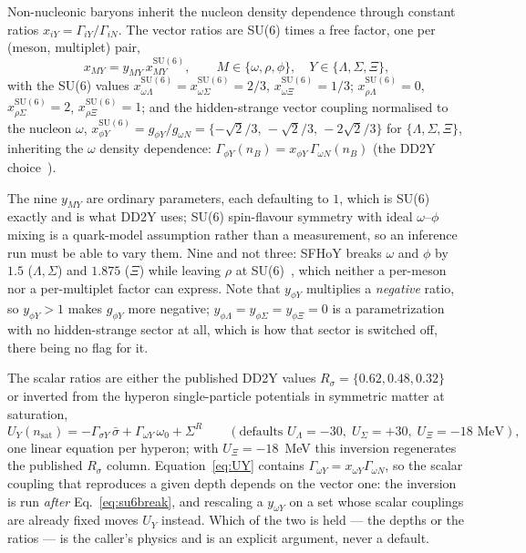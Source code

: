 \documentclass[aps,prc,onecolumn,superscriptaddress,nofootinbib,10pt]{revtex4-2}
\newcommand{\nB}{n_B}
\newcommand{\nsat}{n_{\mathrm{sat}}}
\newcommand{\SigR}{\Sigma^{R}}
\begin{document}
Non-nucleonic baryons inherit the nucleon density dependence through constant
ratios $x_{iY} = \Gamma_{iY}/\Gamma_{iN}$. The vector ratios are SU(6) times a
free factor, one per (meson, multiplet) pair,
%
\begin{equation}
x_{M Y} = y_{M Y}\, x_{M Y}^{\mathrm{SU(6)}},
\qquad M \in \{\omega, \rho, \phi\},\quad
Y \in \{\Lambda, \Sigma, \Xi\},
\label{eq:su6break}
\end{equation}
%
with the SU(6) values
$x^{\mathrm{SU(6)}}_{\omega\Lambda} = x^{\mathrm{SU(6)}}_{\omega\Sigma} = 2/3$,
$x^{\mathrm{SU(6)}}_{\omega\Xi} = 1/3$;
$x^{\mathrm{SU(6)}}_{\rho\Lambda} = 0$,
$x^{\mathrm{SU(6)}}_{\rho\Sigma} = 2$,
$x^{\mathrm{SU(6)}}_{\rho\Xi} = 1$; and the hidden-strange vector coupling
normalised to the nucleon $\omega$,
$x^{\mathrm{SU(6)}}_{\phi Y} = g_{\phi Y}/g_{\omega N}
 = \{-\sqrt2/3,\, -\sqrt2/3,\, -2\sqrt2/3\}$ for $\{\Lambda, \Sigma, \Xi\}$,
inheriting the $\omega$ density dependence:
$\Gamma_{\phi Y}(\nB) = x_{\phi Y}\, \Gamma_{\omega N}(\nB)$ (the DD2Y
choice~\cite{Marques2017}).

The nine $y_{M Y}$ are ordinary parameters, each defaulting to $1$, which is
SU(6) exactly and is what DD2Y uses; SU(6) spin-flavour symmetry with ideal
$\omega$--$\phi$ mixing is a quark-model assumption rather than a measurement,
so an inference run must be able to vary them. Nine and not three: SFHoY
breaks $\omega$ and $\phi$ by $1.5$ ($\Lambda, \Sigma$) and $1.875$ ($\Xi$)
while leaving $\rho$ at SU(6)~\cite{Fortin2017}, which neither a per-meson nor
a per-multiplet factor can express. Note that $y_{\phi Y}$ multiplies a
\emph{negative} ratio, so $y_{\phi Y} > 1$ makes $g_{\phi Y}$ more negative;
$y_{\phi\Lambda} = y_{\phi\Sigma} = y_{\phi\Xi} = 0$ is a parametrization with
no hidden-strange sector at all, which is how that sector is switched off,
there being no flag for it.

The scalar ratios are either the published DD2Y values
$R_\sigma = \{0.62, 0.48, 0.32\}$~\cite{Fortin2017} or inverted from
the hyperon single-particle potentials in symmetric matter at saturation,
%
\begin{equation}
U_Y(\nsat) = -\Gamma_{\sigma Y}\, \bar\sigma
             + \Gamma_{\omega Y}\, \omega_0 + \SigR
\qquad (\text{defaults } U_\Lambda = -30,\; U_\Sigma = +30,\;
        U_\Xi = -18 \text{ MeV}),
\label{eq:UY}
\end{equation}
%
one linear equation per hyperon; with $U_\Xi = -18$~MeV this inversion
regenerates the published $R_\sigma$ column. Equation~\eqref{eq:UY} contains
$\Gamma_{\omega Y} = x_{\omega Y}\Gamma_{\omega N}$, so the scalar coupling
that reproduces a given depth depends on the vector one: the inversion is run
\emph{after} Eq.~\eqref{eq:su6break}, and rescaling a $y_{\omega Y}$ on a set
whose scalar couplings are already fixed moves $U_Y$ instead. Which of the two
is held --- the depths or the ratios --- is the caller's physics and is an
explicit argument, never a default.
\end{document}
